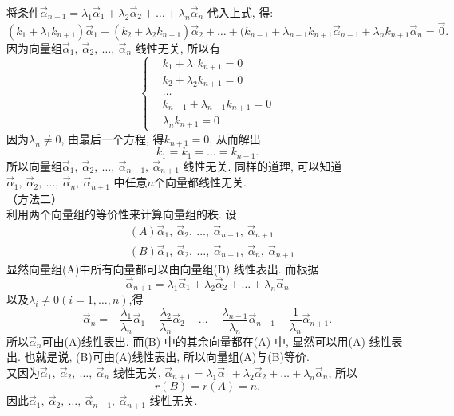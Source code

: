将条件$\vec{\alpha}_{n+1}=\lambda_1\vec{\alpha}_1+\lambda_2\vec{\alpha}_2+\dots+\lambda_n\vec{\alpha}_n$ 代入上式, 得:
$$(k_1+\lambda_1k_{n+1})\vec{\alpha}_1+(k_2+\lambda_2k_{n+1})\vec{\alpha}_2+\dots+(k_{n-1}+\lambda_{n-1}k_{n+1}\vec{\alpha}_{n-1}+
\lambda_nk_{n+1}\vec{\alpha}_n=\vec{0}.$$
因为向量组$\vec{\alpha}_1, \ \vec{\alpha}_2, \ \dots,\ \vec{\alpha}_n$ 线性无关, 所以有
\begin{displaymath}\left\{\begin{aligned}&k_1+\lambda_1k_{n+1}=0\\&k_2+\lambda_2k_{n+1}=0\\&\dots \\ &k_{n-1}+\lambda_{n-1}k_{n+1}=0 \\ &\lambda_nk_{n+1}=0\end{aligned}
\right.\end{displaymath}
因为$\lambda_n\not=0$, 由最后一个方程, 得$k_{n+1}=0$, 从而解出$$k_1=k_1=\dots=k_{n-1}.$$
所以向量组$\vec{\alpha}_1, \ \vec{\alpha}_2, \ \dots,\ \vec{\alpha}_{n-1},\ \vec{\alpha}_{n+1}$ 线性无关. 同样的道理,
可以知道$\vec{\alpha}_1, \ \vec{\alpha}_2, \ \dots,\ \vec{\alpha}_n,\ \vec{\alpha}_{n+1}$ 中任意$n$个向量都线性无关.\\
（方法二）\\
利用两个向量组的等价性来计算向量组的秩. 设
\begin{displaymath}\begin{aligned}&(A)\vec{\alpha}_1,  \ \vec{\alpha}_2, \ \dots,\ \vec{\alpha}_{n-1},\ \vec{\alpha}_{n+1}\\
&(B)\vec{\alpha}_1, \ \vec{\alpha}_2, \ \dots,\ \vec{\alpha}_{n-1},\ \vec{\alpha}_n,\ \vec{\alpha}_{n+1}\end{aligned}\end{displaymath}
显然向量组(A)中所有向量都可以由向量组(B) 线性表出. 而根据$$\vec{\alpha}_{n+1}=\lambda_1\vec{\alpha}_1+\lambda_2\vec{\alpha}_2+\dots+\lambda_n\vec{\alpha}_n$$ 以及$\lambda_i\not=0(i=1,
\dots,n)$,得
$$\vec{\alpha}_n=-\frac{\lambda_1}{\lambda_n}\vec{\alpha}_1-\frac{\lambda_2}{\lambda_n}\vec{\alpha}_2-\dots-
\frac{\lambda_{n-1}}{\lambda_n}\vec{\alpha}_{n-1}-\frac{1}{\lambda_n}\vec{\alpha}_{n+1}.$$
所以$\vec{\alpha}_n$可由(A)线性表出. 而(B) 中的其余向量都在(A) 中, 显然可以用(A) 线性表出. 也就是说, (B)可由(A)线性表出, 所以向量组(A)与(B)等价.\\
又因为$\vec{\alpha}_1, \ \vec{\alpha}_2, \ \dots,\ \vec{\alpha}_n$ 线性无关, $\vec{\alpha}_{n+1}=\lambda_1\vec{\alpha}_1+\lambda_2\vec{\alpha}_2+\dots+\lambda_n\vec{\alpha}_n$, 所以
$$r(B)=r(A)=n.$$因此$\vec{\alpha}_1, \ \vec{\alpha}_2, \ \dots,\ \vec{\alpha}_{n-1},\ \vec{\alpha}_{n+1}$ 线性无关.\\
